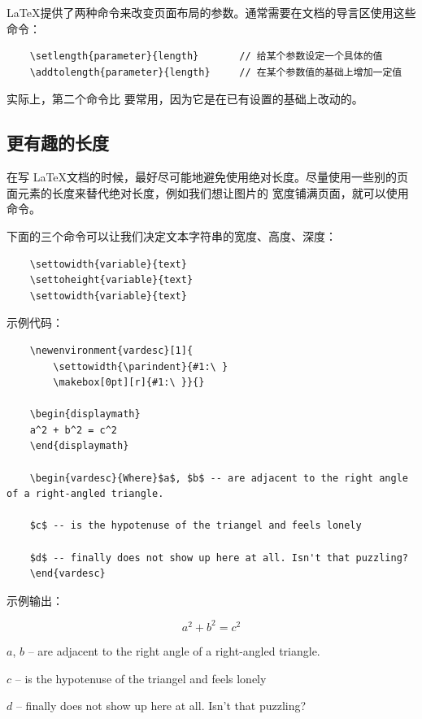 \documentclass[UTF8]{ctexart}
\begin{document}
\LaTeX 提供了两种命令来改变页面布局的参数。通常需要在文档的导言区使用这些命令：
\begin{verbatim}
    \setlength{parameter}{length}       // 给某个参数设定一个具体的值
    \addtolength{parameter}{length}     // 在某个参数值的基础上增加一定值
\end{verbatim}

实际上，第二个命令比 \texttt{\setlength} 要常用，因为它是在已有设置的基础上改动的。

\subsection{更有趣的长度}
在写 \LaTeX 文档的时候，最好尽可能地避免使用绝对长度。尽量使用一些别的页面元素的长度来替代绝对长度，例如我们想让图片的
宽度铺满页面，就可以使用 \texttt{\textwidth} 命令。

下面的三个命令可以让我们决定文本字符串的宽度、高度、深度：
\begin{verbatim}
    \settowidth{variable}{text}
    \settoheight{variable}{text}
    \settowidth{variable}{text}
\end{verbatim}

示例代码：
\begin{verbatim}
    \newenvironment{vardesc}[1]{
        \settowidth{\parindent}{#1:\ }
        \makebox[0pt][r]{#1:\ }}{}

    \begin{displaymath}
    a^2 + b^2 = c^2
    \end{displaymath}

    \begin{vardesc}{Where}$a$, $b$ -- are adjacent to the right angle of a right-angled triangle.

    $c$ -- is the hypotenuse of the triangel and feels lonely

    $d$ -- finally does not show up here at all. Isn't that puzzling?
    \end{vardesc}
\end{verbatim}

示例输出：
\newenvironment{vardesc}[1]{
    \settowidth{\parindent}{#1:\ }
    \makebox[0pt][r]{#1:\ }}{}

\begin{displaymath}
a^2 + b^2 = c^2
\end{displaymath}

\begin{vardesc}{Where}$a$, $b$ -- are adjacent to the right angle of a right-angled triangle.

$c$ -- is the hypotenuse of the triangel and feels lonely

$d$ -- finally does not show up here at all. Isn't that puzzling?
\end{vardesc}
\end{document}
